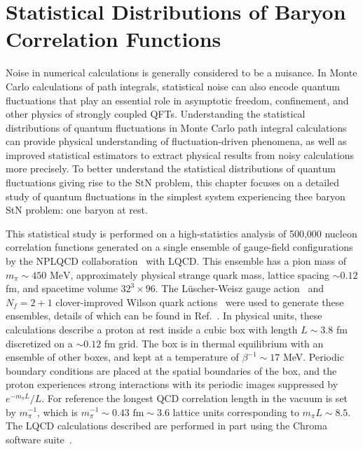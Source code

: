 \chapter{Statistical Distributions of Baryon Correlation Functions}\label{chap:statistics}
 

Noise in numerical calculations is generally considered to be a nuisance.
In Monte Carlo calculations of path integrals, statistical noise can also encode quantum fluctuations that play an essential role in asymptotic freedom, confinement, and other physics of strongly coupled QFTs.
Understanding the statistical distributions of quantum fluctuations in Monte Carlo path integral calculations can provide physical understanding of fluctuation-driven phenomena, as well as improved statistical estimators to extract physical results from noisy calculations more precisely.
To better understand the statistical distributions of quantum fluctuations giving rise to the StN problem,
this chapter focuses on a detailed study of quantum fluctuations in the simplest system experiencing thee baryon StN problem: one baryon at rest.

This statistical study is performed on a high-statistics analysis of 500,000 nucleon correlation functions 
generated on a single ensemble of gauge-field configurations by the NPLQCD collaboration~\cite{Orginos:2015aya} with LQCD.
This ensemble has a pion mass of $m_\pi \sim 450\text{ MeV}$, approximately physical strange quark mass, 
lattice spacing $\sim 0.12$ fm, and spacetime volume $32^3\times 96$. 
The L{\"u}scher-Weisz gauge action~\cite{Luscher:1984xn} and $N_f = 2+1$ clover-improved 
Wilson quark actions~\cite{Sheikholeslami:1985ij} were used to generate these ensembles,
details of which can be found in Ref.~\cite{Orginos:2015aya}.
In physical units, these calculations describe a proton at rest inside a cubic box with length $L \sim 3.8$ fm discretized on a $\sim 0.12$ fm grid.
The box is in thermal equilibrium with an ensemble of other boxes, and kept at a temperature of $\beta^{-1} \sim 17$ MeV.
Periodic boundary conditions are placed at the spatial boundaries of the box, and the proton experiences strong interactions with its periodic images suppressed by $e^{-m_\pi L}/L$.
For reference the longest QCD correlation length in the vacuum is set by $m_\pi^{-1}$, which is $m_\pi^{-1} \sim 0.43\text{ fm} \sim 3.6$ lattice units corresponding to $m_\pi L \sim 8.5$.
The LQCD calculations described are performed in part using the Chroma software suite~\cite{Edwards:2004sx}.

